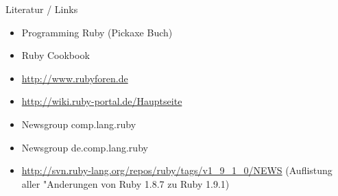 \documentclass{beamer}
\begin{document}
\lstset{language=Ruby}
\lstset{basicstyle=\small,numbers=none, numberstyle=\tiny, numbersep=5pt}
\begin{frame}
  Literatur / Links
  \begin{itemize}
    \item Programming Ruby (Pickaxe Buch) 
    \item Ruby Cookbook
    \item \href{http://www.rubyforen.de}{http://www.rubyforen.de}
    \item \href{http://wiki.ruby-portal.de/Hauptseite}{http://wiki.ruby-portal.de/Hauptseite}
    \item Newsgroup comp.lang.ruby 
    \item Newsgroup de.comp.lang.ruby 
    \item \href{http://svn.ruby-lang.org/repos/ruby/tags/v1\_9\_1\_0/NEWS}{http://svn.ruby-lang.org/repos/ruby/tags/v1\_9\_1\_0/NEWS} (Auflistung aller "Anderungen von Ruby 1.8.7 zu Ruby 1.9.1)
  \end{itemize}
\end{frame}

\end{document}
